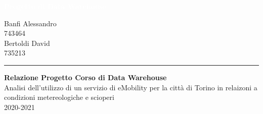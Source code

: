 \documentclass[12pt, a4paper, oneside]{report}
\author{%
    Banfi Alessandro \\
    743464 \\
    -\\
    Bertoldi David \\
    735213 \\
    -\\
    }
\begin{document}
\begin{titlepage}
\BgThispage
{}
\vspace*{0.4\textheight}
\noindent
\textcolor{white}{\Huge\textbf{\textsf{Progetto di Data Warehouse}}}
\vspace*{2cm}\par
\noindent
\begin{minipage}{0.35\linewidth}
    \begin{flushright}
        {%
    Banfi Alessandro \\
    743464 \\[2\baselineskip]
    
    Bertoldi David \\
    735213 
    
    }
    \end{flushright}
\end{minipage} \hspace{35pt}
%
\begin{minipage}{0.02\linewidth}
    \rule{1pt}{175pt}
\end{minipage} \hspace{10pt}
%
\begin{minipage}{0.63\linewidth}
\vspace{5pt}
    {\Huge\textbf{Relazione Progetto Corso di Data Warehouse\\[10pt]}}
   	Analisi dell'utilizzo di un servizio di eMobility per la città di Torino
	in relaizoni a condizioni metereologiche e scioperi
    \\ 2020-2021
\end{minipage}
\end{titlepage}
\restoregeometry


\newpage\tableofcontents\newpage





%


\end{document}
